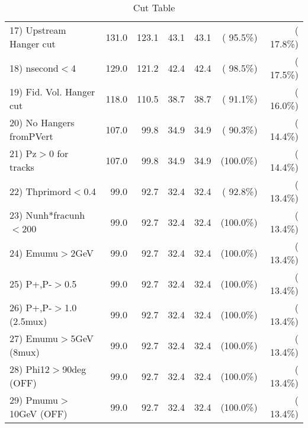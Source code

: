 \begin{table}[h!]
\begin{tabular}{||l||r|r|r|r|r|r||}
 17) Upstream Hanger cut  &        131.0 &        123.1 &         43.1 &         43.1 & ( 95.5\%) & ( 17.8\%) \\
 18) nsecond$<$4          &        129.0 &        121.2 &         42.4 &         42.4 & ( 98.5\%) & ( 17.5\%) \\
 19) Fid. Vol. Hanger cut &        118.0 &        110.5 &         38.7 &         38.7 & ( 91.1\%) & ( 16.0\%) \\
 20) No Hangers fromPVert &        107.0 &         99.8 &         34.9 &         34.9 & ( 90.3\%) & ( 14.4\%) \\
 21) Pz$>$0 for tracks    &        107.0 &         99.8 &         34.9 &         34.9 & (100.0\%) & ( 14.4\%) \\
 22) Thprimord$<$0.4      &         99.0 &         92.7 &         32.4 &         32.4 & ( 92.8\%) & ( 13.4\%) \\
 23) Nunh*fracunh$<$200   &         99.0 &         92.7 &         32.4 &         32.4 & (100.0\%) & ( 13.4\%) \\
 24) Emumu$>$2GeV         &         99.0 &         92.7 &         32.4 &         32.4 & (100.0\%) & ( 13.4\%) \\
 25) P+,P-$>$0.5          &         99.0 &         92.7 &         32.4 &         32.4 & (100.0\%) & ( 13.4\%) \\
 26) P+,P-$>$1.0 (2.5mux) &         99.0 &         92.7 &         32.4 &         32.4 & (100.0\%) & ( 13.4\%) \\
 27) Emumu$>$5GeV  (8mux) &         99.0 &         92.7 &         32.4 &         32.4 & (100.0\%) & ( 13.4\%) \\
 28) Phi12$>$90deg  (OFF) &         99.0 &         92.7 &         32.4 &         32.4 & (100.0\%) & ( 13.4\%) \\
 29) Pmumu$>$10GeV  (OFF) &         99.0 &         92.7 &         32.4 &         32.4 & (100.0\%) & ( 13.4\%) \\
 \hline
 \hline
 \end{tabular}
 \caption{Cut Table           }
 \label{tab-cutcohjpsi-mumu_ccdis}
 \end{table}
